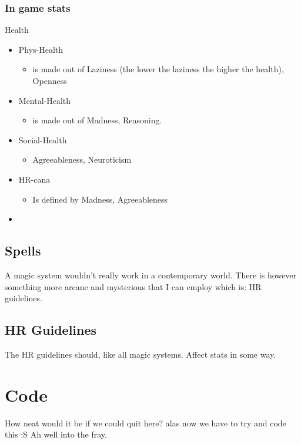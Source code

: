 \documentclass[11pt]{article}
\begin{document}
\subsubsection{In game stats}
\label{sec:org3f9fd3b}

Health
\begin{itemize}
\item Phys-Health
\begin{itemize}
\item is made out of Laziness (the lower the laziness the higher the health), Openness
\end{itemize}
\item Mental-Health
\begin{itemize}
\item is made out of Madness, Reasoning.
\end{itemize}
\item Social-Health
\begin{itemize}
\item Agreeableness, Neuroticism
\end{itemize}

\item HR-cana
\begin{itemize}
\item Is defined by Madness, Agreeableness
\end{itemize}
\item 
\end{itemize}


\subsection{Spells}
\label{sec:orgaf3bed3}

A magic system wouldn't really work in a contemporary world. There is however something more arcane and mysterious that I can employ which is: HR guidelines.

\subsection{HR Guidelines}
\label{sec:orgd80c8e5}

The HR guidelines should, like all magic systems. Affect stats in some way.

\section{Code}
\label{sec:org674b2d0}

How neat would it be if we could quit here? alas now we have to try and code this :S 
Ah well into the fray.
\end{document}
